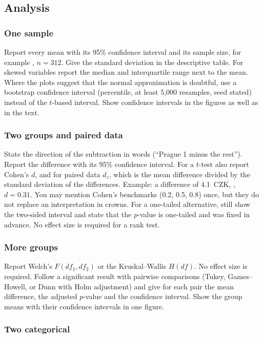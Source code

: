 \documentclass[11pt,a4paper]{article}
\begin{document}
\subsection{Analysis}\label{sec:chk-analysis}

\subsubsection*{One sample}

Report every mean with its 95\% confidence interval and its sample size, for example , $n=312$. Give the standard deviation in the descriptive table. For skewed variables report the median and interquartile range next to the mean. Where the plots suggest that the normal approximation is doubtful, use a bootstrap confidence interval (percentile, at least 5{,}000 resamples, seed stated) instead of the $t$-based interval. Show confidence intervals in the figures as well as in the text.

\subsubsection*{Two groups and paired data}

State the direction of the subtraction in words (``Prague 1 minus the rest''). Report the difference with its 95\% confidence interval. For a $t$-test also report Cohen's $d$, and for paired data $d_z$, which is the mean difference divided by the standard deviation of the differences. Example: a difference of 4.1~CZK, , $d=0.31$. You may mention Cohen's benchmarks (0.2, 0.5, 0.8) once, but they do not replace an interpretation in crowns. For a one-tailed alternative, still show the two-sided interval and state that the $p$-value is one-tailed and was fixed in advance. No effect size is required for a rank test.

\subsubsection*{More groups}

Report Welch's $F(df_1,df_2)$ or the Kruskal--Wallis $H(df)$. No effect size is required. Follow a significant result with pairwise comparisons (Tukey, Games--Howell, or Dunn with Holm adjustment) and give for each pair the mean difference, the adjusted $p$-value and the confidence interval. Show the group means with their confidence intervals in one figure.

\subsubsection*{Two categorical}
\end{document}
